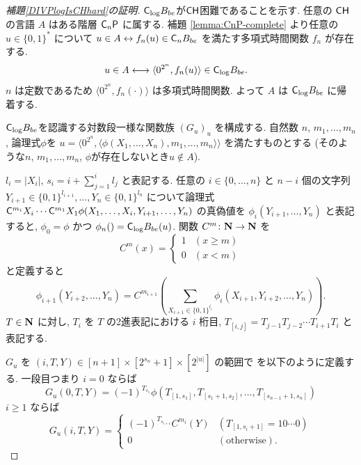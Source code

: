 \begin{proof}[\textup{補題\ref{DIVPlogIsCHhard}の証明}]
 $\mathsf{C}_{\log} B_{be}$が$\mathsf{CH}$困難であることを示す.
 任意の $\mathsf{CH}$ の言語 $A$ はある階層 $\mathsf{C}_n \mathsf{P}$ に属する. 
 補題 \ref{lemma:CnP-complete} より任意の $u \in \{0,1\}^*$ について
 $u \in A \leftrightarrow f_n(u) \in \mathsf{C}_n B_{be}$ 
 を満たす多項式時間関数 $f_n$ が存在する.
 \begin{align}
  u \in A 
  & \longleftrightarrow \langle 0^{2^n}, f_n(u) \rangle \in \mathsf{C}_{\log} B_{be}.
 \end{align}
 $n$ は定数であるため $\langle 0^{2^n}, f_n(\cdot) \rangle$ は多項式時間関数.
 よって $A$ は $\mathsf{C}_{\log} B_{be}$ に帰着する.


 $\mathsf{C}_{\log} B_{be}$を認識する対数段一様な関数族 $(G_u)_u$ を構成する.
 自然数 $n$, $m_1, \dots, m_n$, 論理式$\phi$を
 $u  = \langle 0^{2^n}, 
 \langle \phi(X_1, \dots, X_n), m_1, \dots, m_n \rangle \rangle$
 を満たすものとする
 (そのような$n$, $m_1, \dots, m_n$, $\phi$が存在しないとき$u \not \in A$).
 
 
 $l_i = |X_i|$, $s_i = i + \sum^i_{j=1}l_j$ と表記する.
 任意の $i \in \{0, \dots, n\}$ と $n-i$ 個の文字列 
 $Y_{i+1} \in \{0,1\}^{l_{i+1}}, \dots, Y_n \in \{0,1\}^{l_n}$ 
 について論理式
 $\mathsf{C}^{m_{i}}{X_i} \cdots \mathsf{C}^{m_1}{X_1}
 \phi(X_1, \dots, X_i, Y_{i+1}, \dots, Y_n)$
 の真偽値を $\phi_i(Y_{i+1}, \dots, Y_n)$ と表記すると,
 $\phi_0 = \phi$ かつ $\phi_n() = \mathsf{C}_{\log} B_{be} (u)$.
 関数 $C^m \colon \mathbf N \to \mathbf N$ を
 \begin{equation}
  C^m(x) 
     = \begin{cases}
       1 & (x \ge m) \\
       0 & (x < m) 
       \end{cases}
 \end{equation}
 と定義すると
 \begin{equation} \label{eq:phi-step}
  \phi_{i+1}(Y_{i+2}, \dots, Y_n) 
  = C^{m_{i+1}}\left(\sum_{X_{i+1} \in \{ 0,1 \} ^{l_i}}
   \phi_i(X_{i+1}, Y_{i+2}, \dots, Y_{n})\right).
 \end{equation}
 $T \in \mathbf N$ に対し, $T_i$ を $T$ の2進表記における $i$ 桁目, 
 $T_{[i,j]} = T_{j-1} T_{j-2} \cdots T_{i+1} T_{i}$ と表記する.


 $G_u$ を $(i, T, Y) \in [n+1] \times [2^{s_n}+1] \times [2^{|u|}]$ の範囲で
 を以下のように定義する. 一段目つまり $i=0$ ならば
 \begin{equation}\label{eq:def-Gu:case0}
  G_u(0,T,Y) = 
   (-1)^{T_{s_1}}\phi(T_{[1,s_1]}, T_{[s_1+1,s_2]},
    \dots, T_{[s_{n-1}+1,s_n]}) 
 \end{equation}
 $i \ge 1$ ならば
 \begin{equation} 
  G_u(i,T,Y) = 
   \begin{cases}
    (-1)^{T_{s_{i+1}}} C^{m_i}(Y) 
    & (T_{[1,s_i+1]} = 10 \cdots 0) \\
    0 & (\text{otherwise}).
   \end{cases} 
 \end{equation}


\end{proof}
